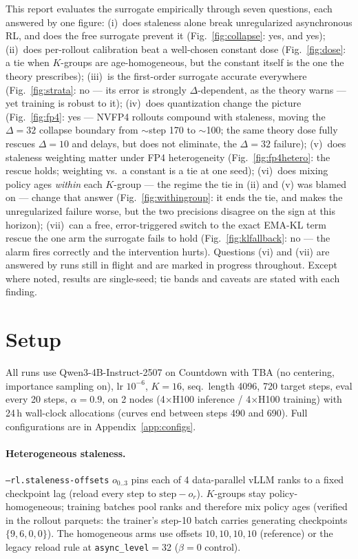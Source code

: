 \documentclass[11pt]{amsart}
\begin{document}
This report evaluates the surrogate empirically through seven questions, each
answered by one figure:
(i)~does staleness alone break unregularized asynchronous RL, and does the
free surrogate prevent it (Fig.~\ref{fig:collapse}: yes, and yes);
(ii)~does per-rollout calibration beat a well-chosen constant dose
(Fig.~\ref{fig:dose}: a tie when $K$-groups are age-homogeneous, but the
constant itself is the one the theory prescribes);
(iii)~is the first-order surrogate accurate everywhere
(Fig.~\ref{fig:strata}: no --- its error is strongly $\Delta$-dependent, as
the theory warns --- yet training is robust to it);
(iv)~does quantization change the picture (Fig.~\ref{fig:fp4}: yes ---
NVFP4 rollouts compound with staleness, moving the $\Delta{=}32$ collapse
boundary from ${\sim}$step 170 to ${\sim}$100; the same theory dose fully
rescues $\Delta{=}10$ and delays, but does not eliminate, the $\Delta{=}32$
failure);
(v)~does staleness weighting matter under FP4 heterogeneity
(Fig.~\ref{fig:fp4hetero}: the rescue holds; weighting vs.\ a constant is a
tie at one seed);
(vi)~does mixing policy ages \emph{within} each $K$-group --- the regime the
tie in (ii) and (v) was blamed on --- change that answer
(Fig.~\ref{fig:withingroup}: it ends the tie, and makes the unregularized
failure worse, but the two precisions disagree on the sign at this horizon);
(vii)~can a free, error-triggered switch to the exact EMA-KL term rescue the
one arm the surrogate fails to hold (Fig.~\ref{fig:klfallback}: no --- the
alarm fires correctly and the intervention hurts). Questions (vi) and (vii)
are answered by runs still in flight and are marked in progress throughout.
Except where noted, results are single-seed; tie bands and caveats are stated
with each finding.

\section{Setup}

All runs use Qwen3-4B-Instruct-2507 on Countdown with TBA (no centering,
importance sampling on), lr $10^{-6}$, $K{=}16$, seq.\ length 4096, 720
target steps, eval every 20 steps, $\alpha=0.9$, on 2 nodes (4$\times$H100
inference / 4$\times$H100 training) with 24\,h wall-clock allocations
(curves end between steps 490 and 690). Full configurations are in
Appendix~\ref{app:configs}.

\paragraph{Heterogeneous staleness.} \texttt{--rl.staleness-offsets}
$o_{0..3}$ pins each of 4 data-parallel vLLM ranks to a fixed checkpoint lag
(reload every step to $\mathrm{step}-o_r$). $K$-groups stay
policy-homogeneous; training batches pool ranks and therefore mix policy
ages (verified in the rollout parquets: the trainer's step-10 batch carries
generating checkpoints $\{9,6,0,0\}$). The homogeneous arms use offsets
$10,10,10,10$ (reference) or the legacy reload rule at
\texttt{async\_level}$=$32 ($\beta{=}0$ control).
\end{document}

